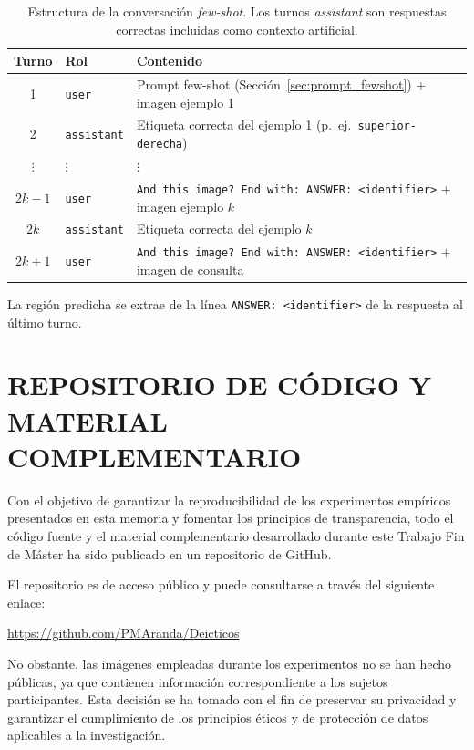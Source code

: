 \documentclass[12pt]{report} %
\begin{document}
\begin{table}[H]
\caption{\label{tab:fewshot_turns}Estructura de la conversación \textit{few-shot}. Los turnos \textit{assistant} son respuestas correctas incluidas como contexto artificial.}
\begin{tabular}{clp{7.5cm}}
\hline
\textbf{Turno} & \textbf{Rol} & \textbf{Contenido} \\
\hline
1 & \texttt{user}      & Prompt few-shot (Sección~\ref{sec:prompt_fewshot}) + imagen ejemplo 1 \\
2 & \texttt{assistant} & Etiqueta correcta del ejemplo 1 (p.~ej.\ \texttt{superior-derecha}) \\
$\vdots$ & $\vdots$ & $\vdots$ \\
$2k{-}1$ & \texttt{user}      & \texttt{And this image? End with: ANSWER: <identifier>} + imagen ejemplo $k$ \\
$2k$ & \texttt{assistant} & Etiqueta correcta del ejemplo $k$ \\
$2k{+}1$ & \texttt{user}      & \texttt{And this image? End with: ANSWER: <identifier>} + imagen de consulta \\
\hline
\end{tabular}
\end{table}

La región predicha se extrae de la línea \texttt{ANSWER:~<identifier>} de la respuesta al último turno.

\chapter{REPOSITORIO DE CÓDIGO Y MATERIAL COMPLEMENTARIO}

Con el objetivo de garantizar la reproducibilidad de los experimentos empíricos presentados en esta memoria y fomentar los principios de transparencia, todo el código fuente y el material complementario desarrollado durante este Trabajo Fin de Máster ha sido publicado en un repositorio de GitHub.


El repositorio es de acceso público y puede consultarse a través del siguiente enlace:

\vspace{0.5cm}
\begin{center}
    \url{https://github.com/PMAranda/Deicticos}
\end{center}
\vspace{0.5cm}

No obstante, las imágenes empleadas durante los experimentos no se han hecho públicas, ya que contienen información correspondiente a los sujetos participantes. Esta decisión se ha tomado con el fin de preservar su privacidad y garantizar el cumplimiento de los principios éticos y de protección de datos aplicables a la investigación.
\end{document}
